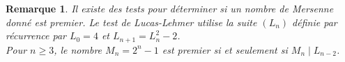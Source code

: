 \documentclass[11pt,a4paper]{article}
\newtheorem*{rem}{Remarque}
\begin{document}
\begin{rem}
Il existe des tests pour déterminer si un nombre de Mersenne donné est premier. Le test de Lucas-Lehmer utilise la suite $(L_n)$ définie par récurrence par $L_0=4$ et $L_{n+1}=L_n^2-2$.\\
Pour $n \geqslant 3$, le nombre $M_n= 2^n -1$ est premier si et seulement si $M_n \mid L_{n-2}$. 
\end{rem}

\begin{comment}
\section*{Correction}

Exercice~\ref{exDivision_Euclidienne}.

(1) \begin{center}
\begin{tabular}{l}
DivEucl$($a,b$)$\\
$ Q \leftarrow 0$ \\
$R \leftarrow a$ \\
tant que $Q \notin \llbracket 0,b-1\rrbracket$ :\\
\ \ \ {\rm  |}$R\leftarrow R-b$\\
\ \ \ {\rm  |}$Q\leftarrow Q+1$\\
renvoyer $(Q,R)$.

\end{tabular}
\end{center}

\begin{itemize}
\item[•] Terminaison de l'algorithme : si à l'étape $k$, $R_k\geq b$, $R_{k+1}=R_k-b<R_k$ donc à chaque passage dans la boucle, $R$ diminiue strictement. Il y a donc au plus $a$ étapes (en fait $\lfloor a/b\rfloor$).

\item[•] Validité du résultat : si $k$ est tel que $R_k,R_{k+1}$ sont définis, alors $b Q_{k+1} +R_{k+1}= b(Q_k+1)+R_k-b=b Q_k+R_k$. Soit $\ell$ la dernière étape. On a donc $bQ_\ell+R_\ell=b Q_1+R_1=a$.
\end{itemize}

(2) \begin{itemize}
\item[•] Terminaison de l'algorithme : on a $n\geq 0$ et $c\geq 1$ donc si à l'étape $k$, $R_k\geq b$, alors $R_{k+1}\leq R_k-10^n bc\leq R_k-b<R_k$, il y a donc au plus $a$ étapes.

\item[•] Validité du résultat : on à $bQ_{k+1}+R_{k+1}=bQ_k+R_k$ ...
\end{itemize}


\end{comment}
\end{document}
